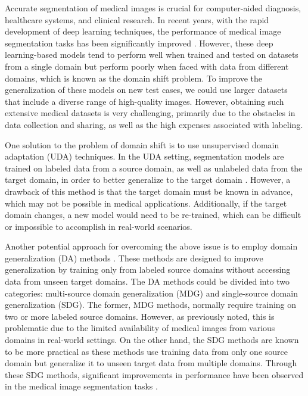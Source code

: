 Accurate segmentation of medical images is crucial for computer-aided diagnosis, healthcare systems, and clinical research. 
In recent years, with the rapid development of deep learning techniques, the performance of medical image segmentation tasks has been significantly improved \cite{qureshi2023medical, azad2024medical}. 
However, these deep learning-based models tend to perform well when trained and tested on datasets from a single domain but perform poorly when faced with data from different domains, which is known as the domain shift problem. 
To improve the generalization of these models on new test cases, we could use larger datasets that include a diverse range of high-quality images. 
However, obtaining such extensive medical datasets is very challenging, primarily due to the obstacles in data collection and sharing, as well as the high expenses associated with labeling. 

One solution to the problem of domain shift is to use unsupervised domain adaptation (UDA) techniques. 
In the UDA setting, segmentation models are trained on labeled data from a source domain, as well as unlabeled data from the target domain, in order to better generalize to the target domain \cite{guan2021domain, kumari2024deep}. 
However, a drawback of this method is that the target domain must be known in advance, which may not be possible in medical applications. 
Additionally, if the target domain changes, a new model would need to be re-trained, which can be difficult or impossible to accomplish in real-world scenarios. 

Another potential approach for overcoming the above issue is to employ domain generalization (DA) methods \cite{matta2024systematic, yoon2024domain}. 
These methods are designed to improve generalization by training only from labeled source domains without accessing data from unseen target domains. 
The DA methods could be divided into two categories: multi-source domain generalization (MDG) and single-source domain generalization (SDG). 
The former, MDG methods, normally require training on two or more labeled source domains. 
However, as previously noted, this is problematic due to the limited availability of medical images from various domains in real-world settings. 
On the other hand, the SDG methods are known to be more practical as these methods use training data from only one source domain but generalize it to unseen target data from multiple domains. 
Through these SDG methods, significant improvements in performance have been observed in the medical image segmentation tasks \cite{su2023rethinking,hu2023devil,yang2024single,liu2024universal,jiang2025structure}. 


